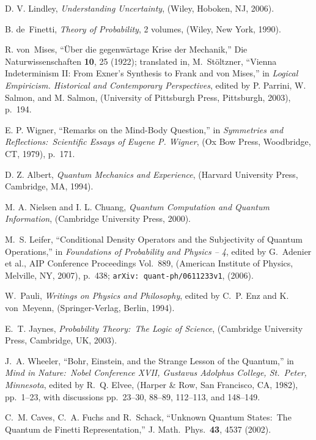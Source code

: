 \begin{thebibliography}{100}
D. V. Lindley, {\sl Understanding Uncertainty}, (Wiley, Hoboken, NJ, 2006).

B. de~Finetti, {\sl Theory of Probability}, 2 volumes, (Wiley, New York, 1990).

R. von~Mises, ``\"Uber die gegenw\"artage Krise der Me\-chan\-ik,'' Die Naturwissenschaften {\bf 10}, 25 (1922); translated in, M.~St\"oltzner, ``Vienna Indeterminism II: From Exner's Synthesis to Frank and von Mises,'' in {\sl Logical Empiricism. Historical and Contemporary Perspectives}, edited by P. Parrini, W. Salmon, and M. Salmon, (University of Pittsburgh Press, Pittsburgh, 2003), p.~194.

E. P. Wigner, ``Remarks on the Mind-Body Question,'' in {\sl Symmetries and Reflections:\ Scientific Essays of Eugene P. Wigner}, (Ox Bow Press, Woodbridge, CT, 1979), p.~171.

D. Z. Albert, {\sl Quantum Mechanics and Experience}, (Harvard University Press, Cambridge, MA, 1994).

M. A. Nielsen and I. L. Chuang, {\sl Quantum Computation and Quantum Information}, (Cambridge University Press, 2000).

M.~S. Leifer, ``Conditional Density Operators and the Subjectivity of Quantum Operations,'' in {\sl Foundations of Probability and Physics -- 4}, edited by G.~Adenier et al., AIP Conference Proceedings Vol.~889, (American Institute of Physics, Melville, NY, 2007), p.~438; {\tt arXiv: quant-ph/0611233v1}, (2006).

W.~Pauli, {\sl Writings on Physics and Philosophy}, edited by C.~P. Enz and K. von~Meyenn, (Springer-Verlag, Berlin, 1994).

E.~T. Jaynes, {\sl Probability Theory:\ The Logic of Science}, (Cambridge University Press, Cambridge, UK, 2003).

J.~A. Wheeler, ``Bohr, Einstein, and the Strange Lesson of the Quantum,'' in {\sl Mind in Nature:~Nobel Conference XVII, Gustavus Adolphus College, St.~Peter, Minnesota}, edited by R.~Q. Elvee, (Harper \& Row, San Francisco, CA, 1982), pp.~1--23, with discussions pp.~23--30, 88--89, 112--113, and 148--149.

C.~M. Caves, C.~A. Fuchs and R.~Schack, ``Unknown Quantum States:\ The Quantum de Finetti Representation,'' J. Math.\ Phys.\ {\bf 43}, 4537 (2002).


\end{thebibliography}
